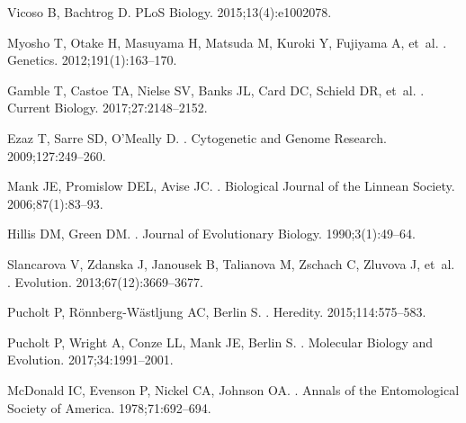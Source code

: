 \documentclass[10pt,letterpaper]{article}
\begin{document}
\begin{thebibliography}{100}
Vicoso B, Bachtrog D.
\newblock PLoS Biology. 2015;13(4):e1002078.

Myosho T, Otake H, Masuyama H, Matsuda M, Kuroki Y, Fujiyama A, et~al.
.
\newblock Genetics. 2012;191(1):163--170.

Gamble T, Castoe TA, Nielse SV, Banks JL, Card DC, Schield DR, et~al.
.
\newblock Current Biology. 2017;27:2148--2152.

Ezaz T, Sarre SD, O'Meally D.
.
\newblock Cytogenetic and Genome Research. 2009;127:249--260.

Mank JE, Promislow DEL, Avise JC.
.
\newblock Biological Journal of the Linnean Society. 2006;87(1):83--93.

Hillis DM, Green DM.
.
\newblock Journal of Evolutionary Biology. 1990;3(1):49--64.

Slancarova V, Zdanska J, Janousek B, Talianova M, Zschach C, Zluvova J, et~al.
.
\newblock Evolution. 2013;67(12):3669--3677.

Pucholt P, R{\"o}nnberg-W{\"a}stljung AC, Berlin S.
.
\newblock Heredity. 2015;114:575--583.

Pucholt P, Wright A, Conze LL, Mank JE, Berlin S.
.
\newblock Molecular Biology and Evolution. 2017;34:1991--2001.

McDonald IC, Evenson P, Nickel CA, Johnson OA.
.
\newblock Annals of the Entomological Society of America. 1978;71:692--694.


\end{thebibliography}
\end{document}

